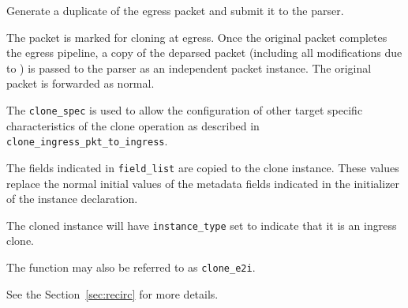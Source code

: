\documentclass[12pt]{article}
\begin{document}

{ %
Generate a duplicate of the egress packet and submit it to the parser.
}
{ %
}
{ %
The packet is marked for cloning at egress. Once the original packet completes 
the egress pipeline, a copy of the deparsed packet (including all modifications 
due to \matchaction) is passed to the parser as an independent packet instance. 
The original packet is forwarded as normal.

The \texttt{clone_spec} is used to allow the configuration of other target specific 
characteristics of the clone operation as described in \texttt{clone_ingress_pkt_to_ingress}. 


The fields indicated in \texttt{field_list} are copied to the clone instance. These 
values replace the normal initial values of the metadata fields indicated 
in the initializer of the instance declaration. 

The cloned instance will have \texttt{instance_type} set to indicate that it is an 
ingress clone. 

The function may also be referred to as \texttt{clone_e2i}.

See the Section~\ref{sec:recirc} for more details.

}

\end{document}
